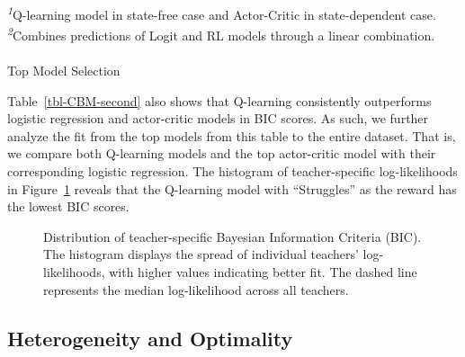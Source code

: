 \documentclass[
  number,
  preprint,
  3p,
  onecolumn]{elsarticle}
\makeatletter
\let\oldparagraph\paragraph
\renewcommand{\paragraph}{
    \@ifstar
      \xxxParagraphStar
      \xxxParagraphNoStar
  }
\newcommand{\xxxParagraphStar}[1]{\oldparagraph*{#1}\mbox{}}
\newcommand{\xxxParagraphNoStar}[1]{\oldparagraph{#1}\mbox{}}
\makeatother
\begin{document}
\begin{minipage}{\linewidth}
\textsuperscript{\textit{1}}Q-learning model in state-free case and Actor-Critic in state-dependent case.\\
\textsuperscript{\textit{2}}Combines predictions of Logit and RL models through a linear combination.\\
\end{minipage}

\paragraph{Top Model Selection}\label{top-model-selection}

Table~\ref{tbl-CBM-second} also shows that Q-learning consistently
outperforms logistic regression and actor-critic models in BIC scores.
As such, we further analyze the fit from the top models from this table
to the entire dataset. That is, we compare both Q-learning models and
the top actor-critic model with their corresponding logistic regression.
The histogram of teacher-specific log-likelihoods in
Figure~\ref{fig-loglik-histogram} reveals that the Q-learning model with
``Struggles'' as the reward has the lowest BIC scores.

\begin{figure}


\caption{\label{fig-loglik-histogram}Distribution of teacher-specific
Bayesian Information Criteria (BIC). The histogram displays the spread
of individual teachers' log-likelihoods, with higher values indicating
better fit. The dashed line represents the median log-likelihood across
all teachers.}

\end{figure}%

\subsection{Heterogeneity and
Optimality}\label{heterogeneity-and-optimality}
\end{document}
